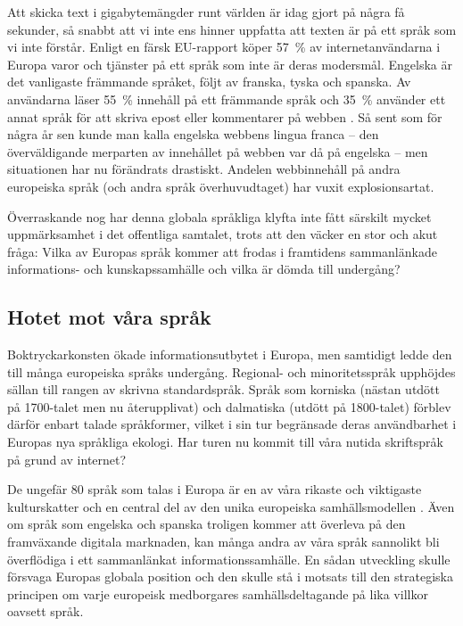\begin{multicols}{2}
Att skicka text i gigabytemängder runt världen är idag gjort på några
få sekunder, så snabbt att vi inte ens hinner uppfatta att texten är
på ett språk som vi inte förstår. Enligt en färsk EU-rapport köper
57~\% av internet\-an\-vänd\-ar\-na i Europa varor och tjänster på ett
språk som inte är deras modersmål. Engelska är det vanligaste
främmande språket, följt av franska, tyska och spanska. Av användarna
läser 55~\% innehåll på ett främmande språk och 35~\% använder ett
annat språk för att skriva epost eller kommentarer på webben \cite{EC1}. Så sent
som för några år sen kunde man kalla engelska webbens lingua franca --
den överväldigande merparten av innehållet på webben var då på
engelska -- men situationen har nu förändrats drastiskt. Andelen
webbinnehåll på andra europeiska språk (och andra språk
överhuvudtaget) har vuxit explosionsartat.

Överraskande nog har denna globala språkliga klyfta inte fått särskilt
mycket uppmärksamhet i det offentliga samtalet, trots att den väcker
en stor och akut fråga: Vilka av Europas språk kommer att frodas i
framtidens samman\-länkade informa\-tions- och kun\-skaps\-sam\-hälle
och vilka är dömda till undergång?


\subsection{Hotet mot våra språk}

Boktryckarkonsten ökade informations\-ut\-bytet i Europa, men
sam\-tidigt ledde den till många europeiska språks
under\-gång. Regional- och minoritets\-språk upphöjdes sällan till
rangen av skrivna standard\-språk. Språk som korniska (nästan utdött
på 1700-talet men nu återupplivat) och dalmatiska (utdött på 1800-talet) förblev därför
enbart talade språkformer, vilket i sin tur begränsade deras
användbarhet i Europas nya språkliga ekologi. Har turen nu kommit till
våra nutida skriftspråk på grund av internet?


De ungefär 80 språk som talas i Europa är en av våra rikaste och
viktigaste kulturskatter och en central del av den unika europeiska
samhällsmodellen \cite{EC2}. Även om språk som engelska och spanska troligen
kommer att överleva på den framväxande digitala marknaden, kan många
andra av våra språk sannolikt bli överflödiga i ett samman\-länkat
informa\-tions\-samhälle. En sådan utveckling skulle försvaga Europas
globala position och den skulle stå i motsats till den strategiska
principen om varje europeisk medborgares samhällsdeltagande på lika
villkor oavsett språk.


\end{multicols}
